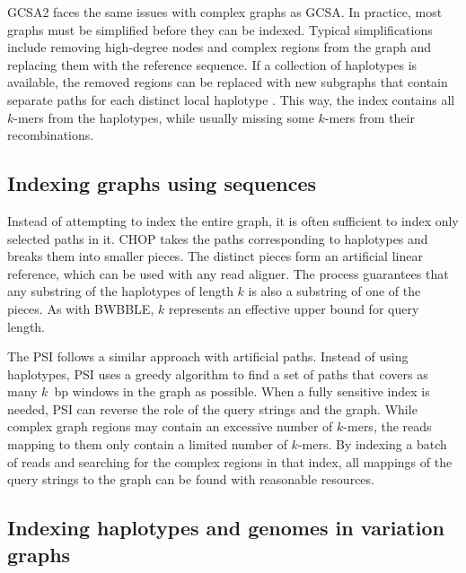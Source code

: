 \textsc{GCSA2} faces the same issues with complex graphs as \textsc{GCSA}.
In practice, most graphs must be simplified before they can be indexed.
Typical simplifications include removing high-degree nodes and complex regions from the graph and replacing them with the reference sequence.
If a collection of haplotypes is available, the removed regions can be replaced with new subgraphs that contain separate paths for each distinct local haplotype \cite{Siren_2019}.
This way, the index contains all $k$-mers from the haplotypes, while usually missing some $k$-mers from their recombinations.

\subsection{Indexing graphs using sequences}

Instead of attempting to index the entire graph, it is often sufficient to index only selected paths in it.
\textsc{CHOP} \cite{Mokveld_2018} takes the paths corresponding to haplotypes and breaks them into smaller pieces.
The distinct pieces form an artificial linear reference, which can be used with any read aligner.
The process guarantees that any substring of the haplotypes of length $k$ is also a substring of one of the pieces.
As with \textsc{BWBBLE}, $k$ represents an effective upper bound for query length.

The \textsc{PSI} \cite{Ghaffaari_2019} follows a similar approach with artificial paths.
Instead of using haplotypes, \textsc{PSI} uses a greedy algorithm to find a set of paths that covers as many $k$~bp windows in the graph as possible.
When a fully sensitive index is needed, \textsc{PSI} can reverse the role of the query strings and the graph.
While complex graph regions may contain an excessive number of $k$-mers, the reads mapping to them only contain a limited number of $k$-mers.
By indexing a batch of reads and searching for the complex regions in that index, all mappings of the query strings to the graph can be found with reasonable resources.

\subsection{Indexing haplotypes and genomes in variation graphs}


